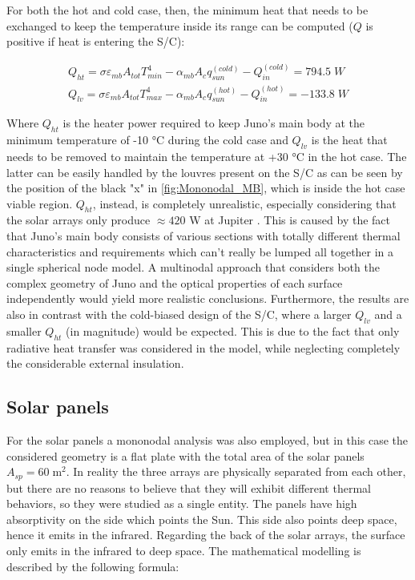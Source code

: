 \vspace*{-3mm}

For both the hot and cold case, then, the minimum heat that needs to be exchanged to keep the temperature inside its range can be computed ($Q$ is positive if heat is entering the S/C):

\begin{gather}
    Q_{ht} = \sigma \varepsilon_{mb} A_{tot} T_{min}^4 - \alpha_{mb} A_c q_{sun}^{(cold)} - Q_{in}^{(cold)} = 794.5 \; W
    \label{eq:mb_mono_cold_heat}
    \\
    Q_{lv} = \sigma \varepsilon_{mb} A_{tot} T_{max}^4 - \alpha_{mb} A_c q_{sun}^{(hot)} - Q_{in}^{(hot)} = -133.8 \; W
    \label{eq:mb_mono_hot_heat}
\end{gather}

Where $Q_{ht}$ is the heater power required to keep Juno's main body at the minimum temperature of -10 °C during the cold case and $Q_{lv}$ is the heat that needs to be removed to maintain the temperature at +30 °C in the hot case. The latter can be easily handled by the louvres present on the S/C as can be seen by the position of the black "x" in \autoref{fig:Mononodal_MB}, which is inside the hot case viable region. $Q_{ht}$, instead, is completely unrealistic, especially considering that the solar arrays only produce $\approx 420$ W at Jupiter \cite{solar_panels_coef}. This is caused by the fact that Juno's main body consists of various sections with totally different thermal characteristics and requirements which can't really be lumped all together in a single spherical node model. A multinodal approach that considers both the complex geometry of Juno and the optical properties of each surface independently would yield more realistic conclusions. Furthermore, the results are also in contrast with the cold-biased design of the S/C, where a larger $Q_{lv}$ and a smaller $Q_{ht}$ (in magnitude) would be expected. This is due to the fact that only radiative heat transfer was considered in the model, while neglecting completely the considerable external insulation. 


\subsection{Solar panels}
\label{subsec:solar_arrays_sizing}

For the solar panels a mononodal analysis was also employed, but in this case the considered geometry is a flat plate with the total area of the solar panels $A_{sp} = 60 \; \textrm{m}^2$. In reality the three arrays are physically separated from each other, but there are no reasons to believe that they will exhibit different thermal behaviors, so they were studied as a single entity. 
The panels have high absorptivity on the side which points the Sun. This side also points deep space, hence it emits in the infrared. Regarding the back of the solar arrays, the surface only emits in the infrared to deep space.
The mathematical modelling is described by the following formula:

